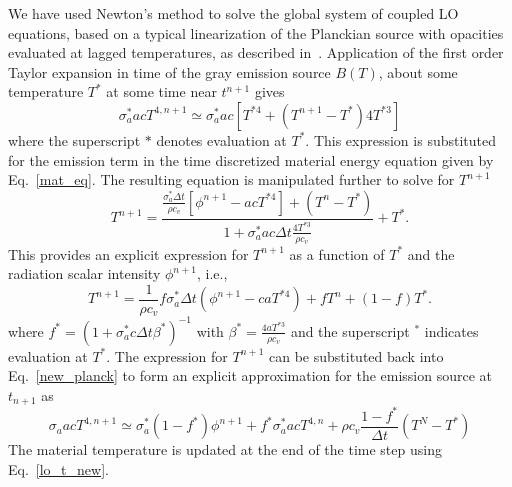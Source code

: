 \documentclass{mc2013}
\begin{document}
We have used Newton's method to solve the global system of coupled LO
equations, based on a typical linearization of the Planckian source with opacities
evaluated at lagged temperatures, as described in~\cite{morel_newton}.  Application of the first order Taylor expansion in time of the
gray emission source $B(T)$, about some temperature $T^*$ at some
time near $t^{n+1}$ gives
\begin{equation}\label{new_planck}
    \sigma_a^* a c T^{4,n+1} \simeq \sigma_a^* a c \left[T^{*4} + (T^{n+1} - T^*) 4T^{*3} \right]
\end{equation}
where the superscript $*$ denotes evaluation at $T^*$. This expression is substituted for the
emission term in the time discretized material
energy equation given by Eq.~\eqref{mat_eq}.  The resulting equation is manipulated
further to solve for $T^{n+1}$
\begin{equation}
 T^{n+1}  = \frac{ {\displaystyle \frac{\sigma_a^* \Delta t}{\rho
c_v}}  \left[ \phi^{n+1} -  a c T^{*4} \right] + (T^n - T^*) }{1 +
        \sigma_a^* a c \Delta t\frac{\displaystyle 4
T^{*3}}{\displaystyle \rho c_v } } + T^*.
\end{equation}
This provides an explicit expression for $T^{n+1}$ as a
function of $T^*$ and the radiation scalar intensity $\phi^{n+1}$, i.e.,
\begin{equation}
\label{lo_t_new}
T^{n+1}  = \frac{1}{\rho c_v } f\sigma_a^* \Delta t \left( \phi^{n+1} - c a T^{*4} \right)
+ f T^n + (1-f) T^*.
\end{equation}
where $f^* = (1 + \sigma_a^* c \Delta t \beta^*)^{-1}$ with
$\beta^* = \frac{4 a T^{*3}}{\rho c_v}$ and the superscript $^*$ indicates evaluation
at $T^*$. The
expression for $T^{n+1}$ can be substituted back into Eq.~\eqref{new_planck} to form
an explicit approximation for the emission source at $t_{n+1}$ as
\begin{equation}\label{t_next1}
    \sigma_a a c T^{4,n+1} \simeq \sigma_a^* (1 -f^*) \phi^{n+1}
    + f^* \sigma_a^* a c T^{4,n} + \rho c_v\frac{1-f^*}{\Delta t} (T^N - T^*)
\end{equation}
The material temperature is updated at the end of the time step using Eq.~\ref{lo_t_new}. 
\end{document}
